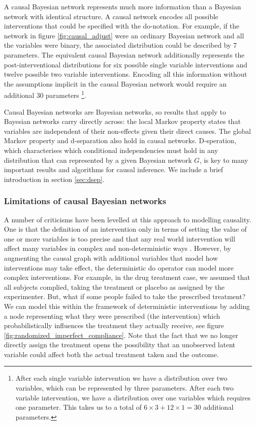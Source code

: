\documentclass[11pt,a4paper,oneside]{book}
\theoremstyle{plain}
\theoremstyle{definition}
\begin{document}
A causal Bayesian network represents much more information than a Bayesian network with identical structure. A causal network encodes all possible interventions that could be specified with the do-notation. For example, if the network in figure \ref{fig:causal_adjust} were an ordinary Bayesian network and all the variables were binary, the associated distribution could be described by 7 parameters. The equivalent causal Bayesian network additionally represents the post-interventional distributions for six possible single variable interventions and twelve possible two variable interventions. Encoding all this information without the assumptions implicit in the causal Bayesian network would require an additional 30 parameters \footnote{After each single variable intervention we have a distribution over two variables, which can be represented by three parameters. After each two variable intervention, we have a distribution over one variables which requires one parameter. This takes us to a total of $6\times3+12\times1 = 30$ additional parameters.}.

Causal Bayesian networks are Bayesian networks, so results that apply to Bayesian networks carry directly across: the local Markov property states that variables are independent of their non-effects given their direct causes. The global Markov property and d-separation also hold in causal networks. D-speration, which characterises which conditional independencies must hold in any distribution that can represented by a given Bayesian network $G$, is key to many important results and algorithms for causal inference. We include a brief introduction in section \ref{sec:dsep}. 

\subsubsection{Limitations of causal Bayesian networks}
A number of criticisms have been levelled at this approach to modelling causality. One is that the definition of an intervention only in terms of setting the value of one or more variables is too precise and that any real world intervention will affect many variables in complex and non-deterministic ways \citep{rickles2009causality,cartwright2007hunting}. However, by augmenting the causal graph with additional variables that model how interventions may take effect, the deterministic do operator can model more complex interventions. For example, in the drug treatment case, we assumed that all subjects complied, taking the treatment or placebo as assigned by the experimenter. But, what if some people failed to take the prescribed treatment? We can model this within the framework of deterministic interventions by adding a node representing what they were prescribed (the intervention) which probabilistically influences the treatment they actually receive, see figure \ref{fig:randomized_imperfect_compliance}. Note that the fact that we no longer directly assign the treatment opens the possibility that an unobserved latent variable could affect both the actual treatment taken and the outcome.
\end{document}
